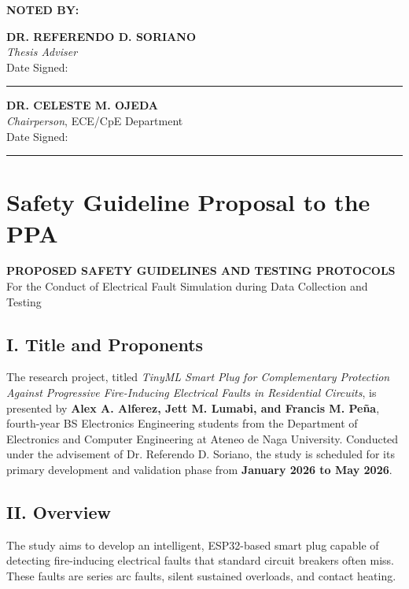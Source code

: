 \vspace{2\baselineskip}
\noindent\textbf{NOTED BY:}

\vspace{3\baselineskip}
\noindent
\begin{minipage}[t]{0.47\textwidth}
\centering
\textbf{DR. REFERENDO D. SORIANO}\\
\emph{Thesis Adviser}\\
Date Signed: \rule{1.45in}{0.4pt}
\end{minipage}\hfill
\begin{minipage}[t]{0.47\textwidth}
\centering
\textbf{DR. CELESTE M. OJEDA}\\
\emph{Chairperson}, ECE/CpE Department\\
Date Signed: \rule{1.45in}{0.4pt}
\end{minipage}

\section{Safety Guideline Proposal to the PPA}
\label{appendix-g-safety-guideline-proposal}

\begin{center}
\textbf{PROPOSED SAFETY GUIDELINES AND TESTING PROTOCOLS}\\
For the Conduct of Electrical Fault Simulation during Data Collection and Testing
\end{center}

\subsection*{I. Title and Proponents}

The research project, titled \emph{TinyML Smart Plug for Complementary
Protection Against Progressive Fire-Inducing Electrical Faults in Residential
Circuits}, is presented by \textbf{Alex A. Alferez, Jett M. Lumabi, and
Francis M. Pe\~{n}a}, fourth-year BS Electronics Engineering students from the
Department of Electronics and Computer Engineering at Ateneo de Naga
University. Conducted under the advisement of Dr. Referendo D. Soriano, the
study is scheduled for its primary development and validation phase from
\textbf{January 2026 to May 2026}.

\subsection*{II. Overview}

The study aims to develop an intelligent, ESP32-based smart plug capable of
detecting fire-inducing electrical faults that standard circuit breakers often
miss. These faults are series arc faults, silent sustained overloads, and
contact heating.

